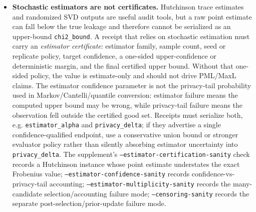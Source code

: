 \documentclass[11pt]{article}
\begin{document}
\begin{itemize}[leftmargin=1.2em]
\item \textbf{Stochastic estimators are not certificates.} Hutchinson trace estimates and randomized SVD outputs are useful audit tools, but a raw point estimate can fall below the true leakage and therefore cannot be serialized as an upper-bound \texttt{chi2\_bound}.  A receipt that relies on stochastic estimation must carry an \emph{estimator certificate}: estimator family, sample count, seed or replicate policy, target confidence, a one-sided upper-confidence or deterministic margin, and the final certified upper bound.  Without that one-sided policy, the value is estimate-only and should not drive PML/MaxL claims.  The estimator confidence parameter is not the privacy-tail probability used in Markov/Cantelli/quantile conversion: estimator failure means the computed upper bound may be wrong, while privacy-tail failure means the observation fell outside the certified good set.  Receipts must serialize both, e.g. \texttt{estimator\_alpha} and \texttt{privacy\_delta}; if they advertise a single confidence-qualified endpoint, use a conservative union bound or stronger evaluator policy rather than silently absorbing estimator uncertainty into \texttt{privacy\_delta}.  The supplement's \texttt{--estimator-certification-sanity} check records a Hutchinson instance whose point estimate understates the exact Frobenius value; \texttt{--estimator-confidence-sanity} records confidence-vs-privacy-tail accounting; \texttt{--estimator-multiplicity-sanity} records the many-candidate selection/accounting failure mode; \texttt{--censoring-sanity} records the separate post-selection/prior-update failure mode.


\end{itemize}
\end{document}
